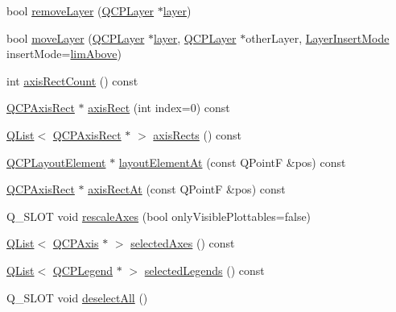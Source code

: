 \begin{DoxyCompactItemize}
\item 
bool \hyperlink{class_q_custom_plot_a40f75e342c5eaab6a86066a42a0e2a94}{remove\+Layer} (\hyperlink{class_q_c_p_layer}{Q\+C\+P\+Layer} $\ast$\hyperlink{class_q_custom_plot_a0a96244e7773b242ef23c32b7bdfb159}{layer})
\item 
bool \hyperlink{class_q_custom_plot_ae896140beff19424e9e9e02d6e331104}{move\+Layer} (\hyperlink{class_q_c_p_layer}{Q\+C\+P\+Layer} $\ast$\hyperlink{class_q_custom_plot_a0a96244e7773b242ef23c32b7bdfb159}{layer}, \hyperlink{class_q_c_p_layer}{Q\+C\+P\+Layer} $\ast$other\+Layer, \hyperlink{class_q_custom_plot_a75a8afbe6ef333b1f3d47abb25b9add7}{Layer\+Insert\+Mode} insert\+Mode=\hyperlink{class_q_custom_plot_a75a8afbe6ef333b1f3d47abb25b9add7a56ffb40bbf81e9b5d869cffc88999a36}{lim\+Above})
\item 
int \hyperlink{class_q_custom_plot_a8f85940aaac50efb466287d9d2d04ec6}{axis\+Rect\+Count} () const
\item 
\hyperlink{class_q_c_p_axis_rect}{Q\+C\+P\+Axis\+Rect} $\ast$ \hyperlink{class_q_custom_plot_ae5eefcb5f6ca26689b1fd4f6e25b42f9}{axis\+Rect} (int index=0) const
\item 
\hyperlink{class_q_list}{Q\+List}$<$ \hyperlink{class_q_c_p_axis_rect}{Q\+C\+P\+Axis\+Rect} $\ast$ $>$ \hyperlink{class_q_custom_plot_a12af771429e2d7e313c8c5d5fca068fe}{axis\+Rects} () const
\item 
\hyperlink{class_q_c_p_layout_element}{Q\+C\+P\+Layout\+Element} $\ast$ \hyperlink{class_q_custom_plot_afaa1d304e0287d140fd238e90889ef3c}{layout\+Element\+At} (const Q\+PointF \&pos) const
\item 
\hyperlink{class_q_c_p_axis_rect}{Q\+C\+P\+Axis\+Rect} $\ast$ \hyperlink{class_q_custom_plot_a4a08842fc3e9ba6bed83aa410c5c5ba5}{axis\+Rect\+At} (const Q\+PointF \&pos) const
\item 
Q\+\_\+\+S\+L\+OT void \hyperlink{class_q_custom_plot_ad86528f2cee6c7e446dea4a6e8839935}{rescale\+Axes} (bool only\+Visible\+Plottables=false)
\item 
\hyperlink{class_q_list}{Q\+List}$<$ \hyperlink{class_q_c_p_axis}{Q\+C\+P\+Axis} $\ast$ $>$ \hyperlink{class_q_custom_plot_a7e6b07792b1cb2c31681596582d14dbe}{selected\+Axes} () const
\item 
\hyperlink{class_q_list}{Q\+List}$<$ \hyperlink{class_q_c_p_legend}{Q\+C\+P\+Legend} $\ast$ $>$ \hyperlink{class_q_custom_plot_ac87624ddff1cbf4064781a8e8ae321c4}{selected\+Legends} () const
\item 
Q\+\_\+\+S\+L\+OT void \hyperlink{class_q_custom_plot_a9d4808ab925b003054085246c92a257c}{deselect\+All} ()

\end{DoxyCompactItemize}
